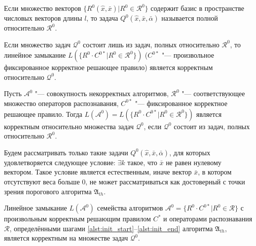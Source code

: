 \begin{Def}
	Если множество векторов $\{R^0(\hat{x},\bar{x})|R^0\in\mathcal R^0\}$ содержит базис в пространстве числовых векторов длины $l$, то задача $Q^0(\hat x,\bar x,\bar\alpha)$ называется полной относительно $\mathcal R^0$.
\end{Def}

\begin{Pred}
	\label{pred:correctness}
	Если множество задач $\mathcal Q^0$ состоит лишь из задач, полных относительно $\mathcal R^0$, то линейное замыкание $L(\{R^0\cdot C^{0*}|R^0\in\mathcal R^0\})$ ($C^{0*}$ "--- произвольное фиксированное корректное решающее правило) является корректным относительно $\mathcal Q^0$.
\end{Pred}

\begin{Corollary}
	Пусть $\mathcal A^0$ "--- совокупность некорректных алгоритмов, $\mathcal R^0$ "--- соответствующее множество операторов распознавания, $C^{0*}$ "--- фиксированное корректное решающее правило. Тогда $L(\mathcal A^0)=L(\{R^0\cdot C^{0*}|R^0\in\mathcal R^0\})$ является корректным относительно множества задач $\mathcal Q^0$, если $\mathcal Q^0$ состоит из задач, полных относительно $\mathcal R^0$.
\end{Corollary}

Будем рассматривать только такие задачи $Q^0(\hat{x},\bar{x},\bar{\alpha})$, для которых удовлетворяется следующее условие: ${\exists}k$ такое, что $\bar x$ не равен нулевому вектором. Такое условие является естественным, иначе вектор $\bar{x}$, в котором отсутствуют веса больше $0$, не может рассматриваться как достоверный с точки зрения порогового алгоритма $\mathfrak A_{th}$.
	
\begin{Theorem}
	\label{th:correctness}
	Линейное замыкание $L(\mathcal A^0)$ семейства алгоритмов $\mathcal A^0=\{R^0\cdot C^{0*}|R^0\in\mathcal R\}$ с произвольным корректным решающим правилом $C^*$ и операторами распознавания $\mathcal R$, определёнными шагами \ref{alst:init_start}--\ref{alst:init_end} алгоритма $\mathfrak A_{th}$, является корректным на множестве задач $\mathcal Q^0$.
\end{Theorem}

